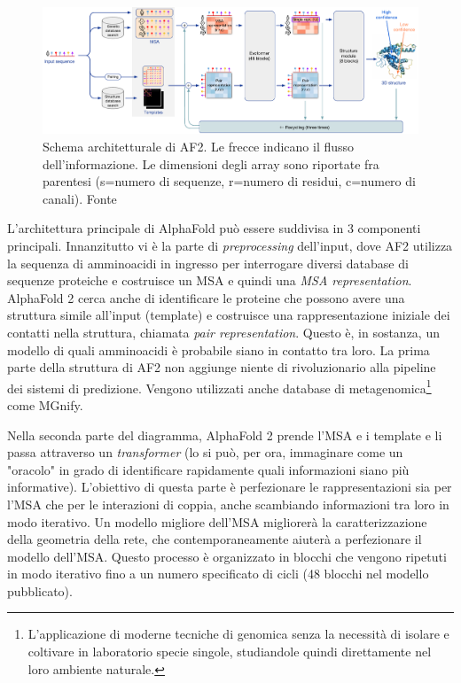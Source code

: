 \begin{figure}[!htb]
	\centering
	\includegraphics[scale=0.38]{images/af-archit.png}
	\caption{Schema architetturale di AF2. Le frecce indicano il flusso dell'informazione. Le dimensioni degli array sono riportate fra parentesi (s=numero di sequenze, r=numero di residui, c=numero di canali). Fonte\cite{jumper2021highly}}
	\label{fig:architettura-af2}
\end{figure}

L'architettura principale di AlphaFold può essere suddivisa in 3 componenti principali. Innanzitutto vi è la parte di \textit{preprocessing} dell'input, dove AF2 utilizza la sequenza di amminoacidi in ingresso per interrogare diversi database di sequenze proteiche e costruisce un MSA e quindi una \textit{MSA representation}. AlphaFold 2 cerca anche di identificare le proteine che possono avere una struttura simile all'input (template) e costruisce una rappresentazione iniziale dei contatti nella struttura, chiamata \textit{pair representation}. Questo è, in sostanza, un modello di quali amminoacidi è probabile siano in contatto tra loro. La prima parte della struttura di AF2 non aggiunge niente di rivoluzionario alla pipeline dei sistemi di predizione. Vengono utilizzati anche database di metagenomica\footnote{L'applicazione di moderne tecniche di genomica senza la necessità di isolare e coltivare in laboratorio specie singole, studiandole quindi direttamente nel loro ambiente naturale.} come MGnify.

\par Nella seconda parte del diagramma, AlphaFold 2 prende l'MSA e i template e li passa attraverso un \textit{transformer} (lo si può, per ora, immaginare come un "oracolo" in grado di identificare rapidamente quali informazioni siano più informative). L'obiettivo di questa parte è perfezionare le rappresentazioni sia per l'MSA che per le interazioni di coppia, anche scambiando informazioni tra loro in modo iterativo. Un modello migliore dell'MSA migliorerà la caratterizzazione della geometria della rete, che contemporaneamente aiuterà a perfezionare il modello dell'MSA. Questo processo è organizzato in blocchi che vengono ripetuti in modo iterativo fino a un numero specificato di cicli (48 blocchi nel modello pubblicato).

